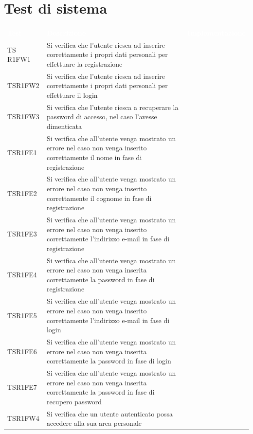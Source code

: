 \section{Test di sistema}
\renewcommand{\arraystretch}{1.5}
\begin{longtable}{ m{}<{\centering}  m{}<{\centering}  m{}<{\centering} }
	\rowcolor{darkblue}
	\textcolor{white}{\textbf{Test}} &\textcolor{white}{\textbf{Descrizione}} & \textcolor{white}{\textbf{Implementazione}} \\ 

	TS	R1FW1 & Si verifica che l'utente riesca ad inserire correttamente i propri dati personali per effettuare la registrazione & \Ni \\
	TSR1FW2 & Si verifica che l'utente riesca ad inserire correttamente i propri dati personali per effettuare il login & \Ni \\
	TSR1FW3 & Si verifica che l'utente riesca a recuperare la password di accesso, nel caso l'avesse dimenticata & \Ni \\
	TSR1FE1 & Si verifica che all'utente venga mostrato un errore nel caso non venga inserito correttamente il nome in fase di registrazione & \Ni \\
	TSR1FE2 & Si verifica che all'utente venga mostrato un errore nel caso non venga inserito correttamente il cognome in fase di registrazione & \Ni \\
	TSR1FE3 & Si verifica che all'utente venga mostrato un errore nel caso non venga inserito correttamente l'indirizzo e-mail in fase di registrazione & \Ni \\
	TSR1FE4 & Si verifica che all'utente venga mostrato un errore nel caso non venga inserita correttamente la password in fase di registrazione & \Ni \\
	TSR1FE5 & Si verifica che all'utente venga mostrato un errore nel caso non venga inserito correttamente l'indirizzo e-mail in fase di login & \Ni \\
	TSR1FE6 & Si verifica che all'utente venga mostrato un errore nel caso non venga inserita correttamente la password in fase di login & \Ni \\
	TSR1FE7 & Si verifica che all'utente venga mostrato un errore nel caso non venga inserita correttamente la password in fase di recupero password & \Ni \\
	TSR1FW4 & Si verifica che un utente autenticato possa accedere alla sua area personale & \Ni \\

\end{longtable}
